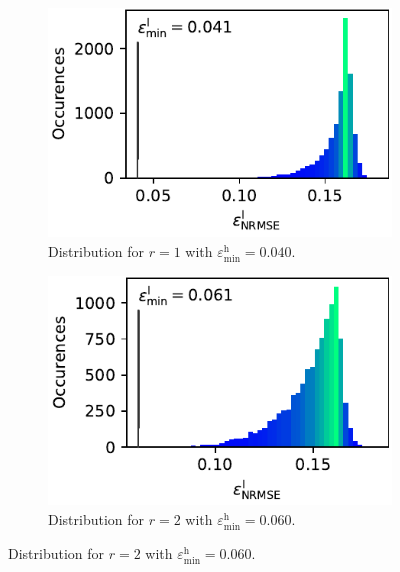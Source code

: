 \documentclass[
  a4paper,  %
  twoside,  %
  bibliography=totoc,
  headsepline,
  cleardoublepage=empty,
  parskip=half,
  draft=false
]{scrbook}
\begin{document}
\begin{mdframed}[style=style]
\vspace{2mm}
\begin{figure}[H]
  \centering
    \begin{subfigure}{.5\textwidth}
  \centering
   \includegraphics[width=\linewidth]{graphics/ww_hist_1}
  \caption{Distribution for $r=1$ with $\varepsilon^\mathrm{h}_{\mathrm{min}}=0.040$.}
\vspace{3mm}
\label{fig:ishigami_hist_1}
\end{subfigure}%
\begin{subfigure}{.5\textwidth}
  \centering
   \includegraphics[width=\linewidth]{graphics/ww_hist_2}
  \caption{Distribution for $r=2$ with $\varepsilon^\mathrm{h}_{\mathrm{min}}=0.060$.}
\vspace{3mm}
\label{fig:ishigami_hist_2}
\end{subfigure}%

\end{figure}
\end{mdframed}
\end{document}
